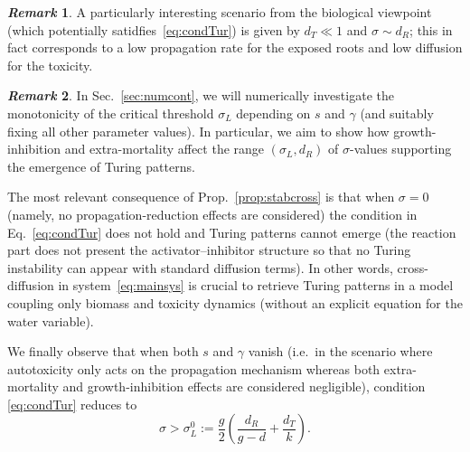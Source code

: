 \documentclass[11pt]{elsarticle}
\theoremstyle{plain}
\theoremstyle{definition}
\theoremstyle{myremark}
\newtheorem*{remark}{\textit{Remark}}
\begin{document}
\begin{remark}
    A particularly interesting scenario from the biological viewpoint (which potentially satidfies~\eqref{eq:condTur}) is given by $d_T \ll 1$ and $\sigma \sim d_R$; this in fact corresponds to a low propagation rate for the exposed roots and low diffusion for the toxicity.
\end{remark}

\begin{remark}
    In Sec.~\ref{sec:numcont}, we will numerically investigate the monotonicity of the critical threshold $\sigma_L$ depending on $s$ and $\gamma$ (and suitably fixing all other parameter values). In particular, we aim to show how growth-inhibition and extra-mortality affect the range $(\sigma_L, d_R)$ of $\sigma$-values supporting the emergence of Turing patterns.
\end{remark}

The most relevant consequence of Prop.~\ref{prop:stabcross} is that when $\sigma=0$ (namely, no propagation-reduction effects are considered) the condition in Eq.~\eqref{eq:condTur} does not hold and Turing patterns cannot emerge (the reaction part does not present the activator--inhibitor structure so that no Turing instability can appear with standard diffusion terms). In other words, cross-diffusion in system~\eqref{eq:mainsys} is crucial to retrieve Turing patterns in a model coupling only biomass and toxicity dynamics (without an explicit equation for the water variable). 




We finally observe that when both $s$ and $\gamma$ vanish (i.e.~in the scenario where autotoxicity only acts on the propagation mechanism whereas both extra-mortality and growth-inhibition effects are considered negligible), condition \eqref{eq:condTur} reduces to
\begin{equation} \label{eq:condTursgam0}
\sigma >\sigma_L^0:=\frac{g}{2} \left(\frac{d_R}{g-d}+\frac{d_T}{k}\right).
\end{equation}
\end{document}
